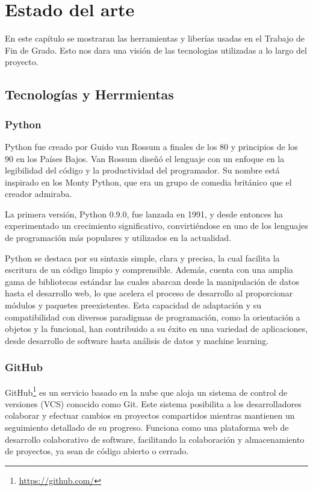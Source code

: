 \documentclass[a4paper, 12pt]{book}
\begin{document}
\cleardoublepage
\chapter{Estado del arte}
\label{chap:estado}

En este capítulo se mostraran las herramientas y liberías usadas en el Trabajo de Fin de Grado. Esto nos 
dara una visión de las tecnologias utilizadas a lo largo del proyecto.

\section{Tecnologías y Herrmientas}
\label{sec:tecnologías y herramientas}

\subsection{Python}
\label{subsec:Python}
Python fue creado por Guido van Rossum a finales de los 80 y principios de los 90 en los Países Bajos. 
Van Rossum diseñó el lenguaje con un enfoque en la legibilidad del código y la productividad del programador. 
Su nombre está inspirado en los Monty Python, que era un grupo de comedia británico que el creador admiraba. 

La primera versión, Python 0.9.0, fue lanzada en 1991, y desde entonces ha experimentado un crecimiento significativo, 
convirtiéndose en uno de los lenguajes de programación más populares y utilizados en la actualidad.

Python se destaca por su sintaxis simple, clara y precisa, la cual facilita la escritura de un código limpio y comprensible. 
Además, cuenta con una amplia gama de bibliotecas estándar las cuales abarcan desde la manipulación de datos hasta el desarrollo web, 
lo que acelera el proceso de desarrollo al proporcionar módulos y paquetes preexistentes. Esta capacidad de adaptación y su compatibilidad 
con diversos paradigmas de programación, como la orientación a objetos y la funcional, han contribuido a su éxito en una variedad de aplicaciones, 
desde desarrollo de software hasta análisis de datos y machine learning.

\subsection{GitHub}
\label{subsec:github}
GitHub\footnote{\url{https://github.com/}} es un servicio basado en la nube que aloja un sistema de control de versiones (VCS) conocido como Git. Este sistema posibilita a los desarrolladores colaborar y efectuar cambios en proyectos compartidos mientras mantienen un seguimiento detallado de su progreso. Funciona como una plataforma web de desarrollo colaborativo de software, facilitando la colaboración y almacenamiento de proyectos, ya sean de código abierto o cerrado.
\end{document}
